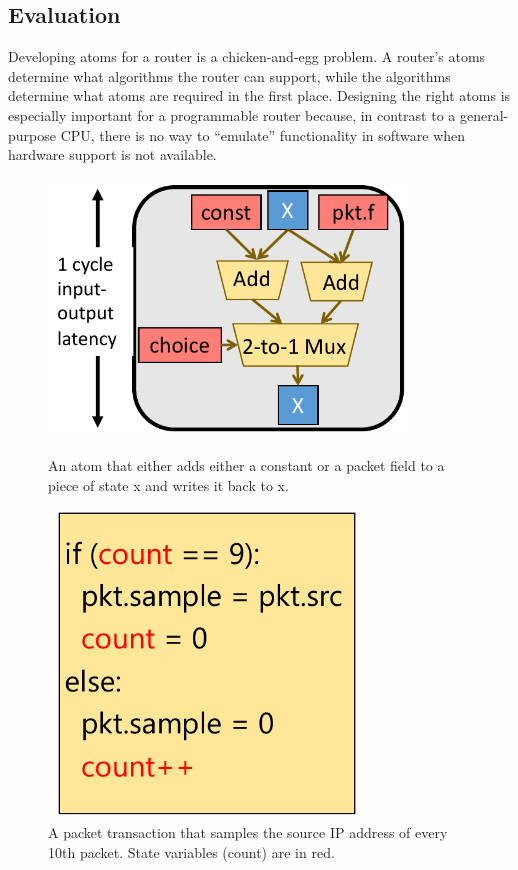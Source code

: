 \subsection{Evaluation}
Developing atoms for a router is a chicken-and-egg problem. A router's atoms
determine what algorithms the router can support, while the algorithms
determine what atoms are required in the first place. Designing the right atoms
is especially important for a programmable router because, in contrast to a
general-purpose CPU, there is no way to ``emulate'' functionality in software
when hardware support is not available.

\begin{figure}[!t]
\begin{minipage}{0.48\textwidth}
\centering
\vspace{0.38in}
\includegraphics[width=0.85\textwidth]{atom.pdf}
\caption{An atom that either adds either a constant or a packet field to a
piece of state x and writes it back to x.}
\label{fig:simple_atom}
\end{minipage}
\hfill
\begin{minipage}{0.48\textwidth}
\centering
\includegraphics[width=0.75\textwidth]{packet_transaction.pdf}
\caption{A packet transaction that samples the source IP address of every 10th
packet. State variables (count) are in red.}
\label{fig:simple_transaction}
\end{minipage}
\end{figure}


